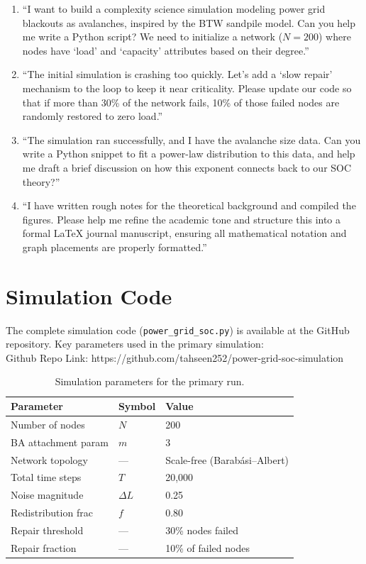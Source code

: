 \documentclass[12pt,a4paper]{article}
\begin{document}
\begin{enumerate}
    \item ``I want to build a complexity science simulation modeling power grid blackouts as avalanches, inspired by the BTW sandpile model. Can you help me write a Python script? We need to initialize a network ($N = 200$) where nodes have `load' and `capacity' attributes based on their degree.''
    
    \item ``The initial simulation is crashing too quickly. Let's add a `slow repair' mechanism to the loop to keep it near criticality. Please update our code so that if more than 30\% of the network fails, 10\% of those failed nodes are randomly restored to zero load.''
    
    \item ``The simulation ran successfully, and I have the avalanche size data. Can you write a Python snippet to fit a power-law distribution to this data, and help me draft a brief discussion on how this exponent connects back to our SOC theory?''
    
    \item ``I have written rough notes for the theoretical background and compiled the figures. Please help me refine the academic tone and structure this into a formal LaTeX journal manuscript, ensuring all mathematical notation and graph placements are properly formatted.''
\end{enumerate}

\section{Simulation Code}
\label{app:code}

The complete simulation code (\texttt{power\_grid\_soc.py}) is available at the GitHub repository. Key parameters used in the primary simulation:
\\ Github Repo Link: https://github.com/tahseen252/power-grid-soc-simulation

\begin{table}[H]
  \centering
  \caption{Simulation parameters for the primary run.}
  \label{tab:params}
  \begin{tabular}{lll}
    \toprule
    \textbf{Parameter} & \textbf{Symbol} & \textbf{Value} \\
    \midrule
    Number of nodes     & $N$     & 200 \\
    BA attachment param & $m$     & 3 \\
    Network topology    & ---     & Scale-free (Barab\'asi--Albert) \\
    Total time steps    & $T$     & 20,000 \\
    Noise magnitude     & $\Delta L$ & 0.25 \\
    Redistribution frac & $f$     & 0.80 \\
    Repair threshold    & ---     & 30\% nodes failed \\
    Repair fraction     & ---     & 10\% of failed nodes \\
    \bottomrule
  \end{tabular}
\end{table}
\end{document}
